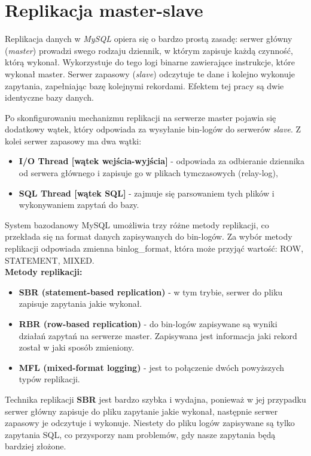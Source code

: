 \section{Replikacja master-slave}

Replikacja danych w \textit{MySQL} opiera się o bardzo prostą zasadę: serwer główny (\textit{master}) prowadzi swego rodzaju dziennik, w którym zapisuje każdą czynność, którą wykonał. Wykorzystuje do tego logi binarne zawierające instrukcje, które wykonał master. Serwer zapasowy (\textit{slave}) odczytuje te dane i kolejno wykonuje zapytania, zapełniając bazę kolejnymi rekordami. Efektem tej pracy są dwie identyczne bazy danych.

Po skonfigurowaniu mechanizmu replikacji na serwerze master pojawia się dodatkowy wątek, który odpowiada za wysyłanie bin-logów do serwerów \textit{slave}. Z kolei serwer zapasowy ma dwa wątki:

\begin{itemize}
	\item \textbf{I/O Thread [wątek wejścia-wyjścia]} - odpowiada za odbieranie dziennika od serwera głównego i zapisuje go w plikach tymczasowych (relay-log),
	\item \textbf{SQL Thread [wątek SQL]} - zajmuje się parsowaniem tych plików i wykonywaniem zapytań do bazy.
\end{itemize}

System bazodanowy MySQL umożliwia trzy różne metody replikacji, co przekłada się na format
danych zapisywanych do bin-logów. Za wybór metody replikacji odpowiada zmienna
binlog\_format, która może przyjąć wartość: ROW, STATEMENT, MIXED. \\

\textbf{Metody replikacji:}
\begin{itemize}
	\item \textbf{SBR (statement-based replication)} - w tym trybie, serwer do pliku zapisuje zapytania jakie
	wykonał.
	\item \textbf{RBR (row-based replication)} - do bin-logów zapisywane są wyniki działań zapytań na
	serwerze master. Zapisywana jest informacja jaki rekord został w jaki sposób zmieniony.
	\item \textbf{MFL (mixed-format logging)} - jest to połączenie dwóch powyższych typów replikacji.
\end{itemize}

Technika replikacji \textbf{SBR} jest bardzo szybka i wydajna, ponieważ w jej przypadku serwer główny
zapisuje do pliku zapytanie jakie wykonał, następnie serwer zapasowy je odczytuje i wykonuje.
Niestety do pliku logów zapisywane są tylko zapytania SQL, co przysporzy nam problemów, gdy
nasze zapytania będą bardziej złożone.\\

